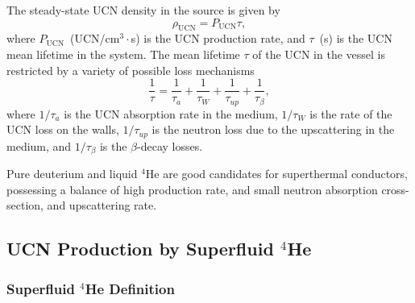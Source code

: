 
The steady-state UCN density in the source is given by
\begin{equation}
\label{ucndensity}
\rho_{\text{UCN}}=P_{\text{UCN}} \tau,
\end{equation}
where $P_{\text{UCN}}$~(UCN/cm$^3 \cdot$s) is the UCN production rate,
and $\tau$~(s) is the UCN mean lifetime in the system.  The mean
lifetime $\tau$ of the UCN in the vessel is restricted by a variety of
possible loss mechanisms
\begin{equation}
\frac{1}{\tau} = \frac{1}{\tau_a}+ \frac{1}{\tau_W}+\frac{1}{\tau_{up}}+\frac{1}{\tau_{\beta}},
\end{equation}
where $1/\tau_a$ is the UCN absorption rate in the medium, $1/\tau_W$
is the rate of the UCN loss on the walls, $1/\tau_{up}$ is the neutron
loss due to the upscattering in the medium, and $1/\tau_{\beta}$ is
the $\beta$-decay losses.

Pure deuterium and liquid $^4$He are good candidates for superthermal
conductors, possessing a balance of high production rate, and small
neutron absorption cross-section, and upscattering rate.


\subsection{UCN Production by Superfluid $^4$He}

\subsubsection{Superfluid $^4$He Definition}


